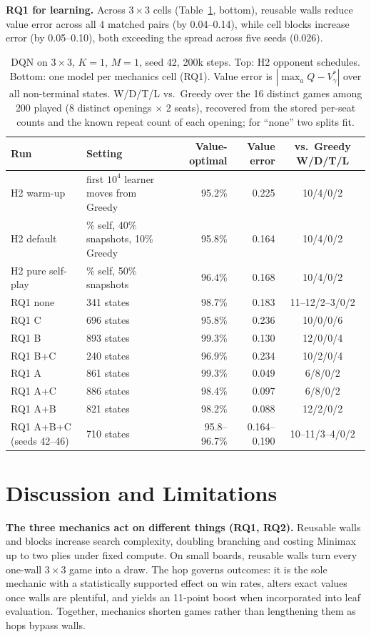 \documentclass[10pt]{article}
\begin{document}
\textbf{RQ1 for learning.} Across $3\times3$ cells (Table~\ref{tab:h2rq1}, bottom), reusable walls reduce value error across all 4 matched pairs (by 0.04--0.14), while cell blocks increase error (by 0.05--0.10), both exceeding the spread across five seeds (0.026).

\begin{table}[!tb]
\centering\small
\caption{DQN on $3\times3$, $K=1$, $M=1$, seed 42, 200k steps. Top: H2 opponent schedules. Bottom: one model per mechanics cell (RQ1). Value error is $|\max_a Q-V^*_\gamma|$ over all non-terminal states. W/D/T/L vs.\ Greedy over the 16 distinct games among 200 played (8 distinct openings $\times$ 2 seats), recovered from the stored per-seat counts and the known repeat count of each opening; for ``none'' two splits fit.}
\label{tab:h2rq1}
\setlength{\tabcolsep}{4pt}
\begin{tabularx}{\textwidth}{l>{\raggedright\arraybackslash}Xrrc}
\toprule
Run & Setting & Value-optimal & Value error & vs.\ Greedy W/D/T/L\\
\midrule
H2 warm-up & first $10^4$ learner moves from Greedy & 95.2\% & 0.225 & 10/4/0/2\\
H2 default & 50\% self, 40\% snapshots, 10\% Greedy & 95.8\% & 0.164 & 10/4/0/2\\
H2 pure self-play & 50\% self, 50\% snapshots & 96.4\% & 0.168 & 10/4/0/2\\
\midrule
RQ1 none & 1{,}341 states & 98.7\% & 0.183 & 11--12/2--3/0/2\\
RQ1 C & 16{,}696 states & 95.8\% & 0.236 & 10/0/0/6\\
RQ1 B & 4{,}893 states & 99.3\% & 0.130 & 12/0/0/4\\
RQ1 B+C & 59{,}240 states & 96.9\% & 0.234 & 10/2/0/4\\
RQ1 A & 3{,}861 states & 99.3\% & 0.049 & 6/8/0/2\\
RQ1 A+C & 46{,}886 states & 98.4\% & 0.097 & 6/8/0/2\\
RQ1 A+B & 12{,}821 states & 98.2\% & 0.088 & 12/2/0/2\\
RQ1 A+B+C (seeds 42--46) & 150{,}710 states & 95.8--96.7\% & 0.164--0.190 & 10--11/3--4/0/2\\
\bottomrule
\end{tabularx}
\end{table}

\section{Discussion and Limitations}
\textbf{The three mechanics act on different things (RQ1, RQ2).} Reusable walls and blocks increase search complexity, doubling branching and costing Minimax up to two plies under fixed compute. On small boards, reusable walls turn every one-wall $3\times3$ game into a draw. The hop governs outcomes: it is the sole mechanic with a statistically supported effect on win rates, alters exact values once walls are plentiful, and yields an 11-point boost when incorporated into leaf evaluation. Together, mechanics shorten games rather than lengthening them as hops bypass walls.
\end{document}

